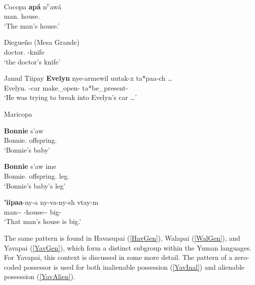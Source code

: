 \begin{exe}\ex\label{CocGen} {Cocopa} \citep[165]{Crawford:1966}\nopagebreak[4]
\gll \textbf{ap\'a} n\textsuperscript{y}aw\'a\\
man.\acc{} house.\acc{}\\
`The man's house.'
\end{exe}


\begin{exe}\ex\label{DieGen} {Diegue\~no (Mesa Grande)} \citep[17]{Gorbet:1976}\nopagebreak[4]
\gll \textbf{}  \\
doctor.\acc{} \poss{}-knife\\
`the doctor's knife'
\end{exe}



\begin{exe}\ex\label{JamGen} {Jamul Tiipay} \citep[152]{Miller:2001}\nopagebreak[4]
\gll \textbf{Evelyn} nye-armewil uutak-x ta*paa-ch \dots\\
Evelyn.\acc{} \ali{}-car make\_open-\irr{} ta*be\_present-\ssbj{}\\
`He was trying to break into Evelyn's car \dots'
\end{exe} 

\begin{exe}\ex\label{MarGen} {Maricopa}  \citep[31, 40]{Gordon:1986}\nopagebreak[4]
\begin{xlist} 
\ex\gll \textbf{Bonnie} s'aw\\
Bonnie.\acc{} offspring.\acc{}\\
`Bonnie's baby'

\ex\gll \textbf{Bonnie} s'aw ime\\
Bonnie.\acc{} offspring.\acc{} leg.\acc{}\\
`Bonnie's baby's leg'

\ex\gll \textbf{'iipaa}-ny-a ny-va-ny-sh vtay-m\\
man-\dem{}-\augv{} \poss{}-house-\dem{}-\nom{} big-\rls{}\\
`That man's house is big.'
\end{xlist}
\end{exe}

The same pattern is found in Havasupai (\ref{HavGen}), Walapai (\ref{WalGen}), and Yavapai (\ref{YavGen}), which form a distinct subgroup within the Yuman languages. 
For Yavapai, this context is discussed in some more detail. 
The pattern of a zero-coded possessor is used for both inalienable possession (\ref{YavInal}) and alienable possession (\ref{YavAlien}).
 
